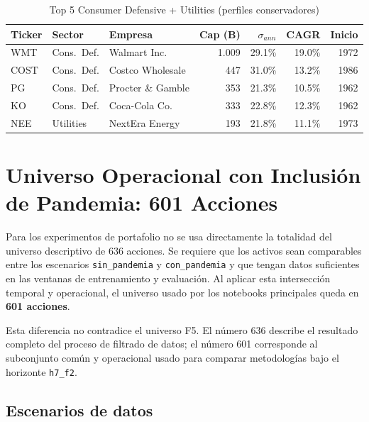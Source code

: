 \begin{table}[H]
  \centering
  \caption{Top 5 Consumer Defensive + Utilities (perfiles conservadores)}
  \small
  \begin{tabular}{lllrrrr}
    \toprule
    \textbf{Ticker} & \textbf{Sector} & \textbf{Empresa} & \textbf{Cap (B)}
                    & \textbf{$\sigma_{ann}$} & \textbf{CAGR} & \textbf{Inicio} \\
    \midrule
    WMT  & Cons.\ Def. & Walmart Inc.      & 1.009 & 29.1\% & 19.0\% & 1972 \\
    COST & Cons.\ Def. & Costco Wholesale  &   447 & 31.0\% & 13.2\% & 1986 \\
    PG   & Cons.\ Def. & Procter \& Gamble &   353 & 21.3\% & 10.5\% & 1962 \\
    KO   & Cons.\ Def. & Coca-Cola Co.     &   333 & 22.8\% & 12.3\% & 1962 \\
    NEE  & Utilities   & NextEra Energy    &   193 & 21.8\% & 11.1\% & 1973 \\
    \bottomrule
  \end{tabular}
\end{table}

\section*{Universo Operacional con Inclusión de Pandemia: 601 Acciones}

Para los experimentos de portafolio no se usa directamente la totalidad del
universo descriptivo de 636 acciones. Se requiere que los activos sean
comparables entre los escenarios \texttt{sin\_pandemia} y \texttt{con\_pandemia}
y que tengan datos suficientes en las ventanas de entrenamiento y evaluación.
Al aplicar esta intersección temporal y operacional, el universo usado por los
notebooks principales queda en \textbf{601 acciones}.

Esta diferencia no contradice el universo F5. El número 636 describe el
resultado completo del proceso de filtrado de datos; el número 601 corresponde
al subconjunto común y operacional usado para comparar metodologías bajo el
horizonte \texttt{h7\_f2}.

\subsection*{Escenarios de datos}

